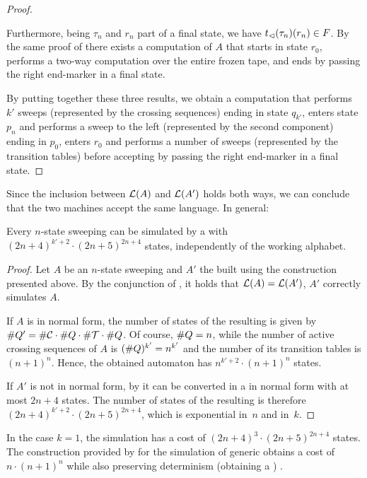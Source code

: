 \begin{proof}
\begin{enumerate}
		      Furthermore, being $\tau_n$ and $r_n$ part of a final state, we have $t_\lhd(\tau_n)(r_n)\in F$.
		      By the same proof of  there exists a computation of $A$ that starts in state $r_0$, performs a two-way computation over the entire frozen tape, and ends by passing the right end-marker in a final state.
	\end{enumerate}
	By putting together these three results, we obtain a computation that performs $k'$ sweeps (represented by the crossing sequences) ending in state $q_{k'}$, enters state $p_n$ and performs a sweep to the left (represented by the second component) ending in $p_0$, enters $r_0$ and performs a number of sweeps (represented by the transition tables) before accepting by passing the right end-marker in a final state.
\end{proof}

Since the inclusion between $\mathcal L(A)$ and $\mathcal L(A')$ holds both ways, we can conclude that the two machines accept the same language.
In general:
\begin{thrm}\label{thm:swkLAtoNFA}
	Every $n$-state sweeping \kDLA can be simulated by a \ONFA with $(2n+4)^{k'+2}\cdot(2n+5)^{2n+4}$ states, independently of the working alphabet.
\end{thrm}
\begin{proof}
	Let $A$ be an $n$-state sweeping \kDLA and $A'$ the \ONFA built using the construction presented above.
	By the conjunction of , it holds that $\mathcal L(A)=\mathcal L(A')$, \ie $A'$ correctly simulates $A$.

	If $A$ is in normal form, the number of states of the resulting \ONFA is given by $\# Q'=\# \mathcal C\cdot\# Q\cdot\# \mathcal T\cdot\# Q$.
	Of course, $\# Q=n$, while the number of active crossing sequences of $A$ is $(\# Q)^{k'}=n^{k'}$ and the number of its transition tables is $(n+1)^n$.
	Hence, the obtained automaton has $n^{k'+2}\cdot(n+1)^n$ states.

	If $A'$ is not in normal form, by  it can be converted in a \kDLA in normal form with at most $2n+4$ states.
	The number of states of the resulting \ONFA is therefore $(2n+4)^{k'+2}\cdot(2n+5)^{2n+4}$, which is exponential in~$n$ and in~$k$.
\end{proof}

In the case $k=1$, the simulation has a cost of $(2n+4)^3\cdot(2n+5)^{2n+4}$ states.
The construction provided by \citeauthor{PigPis14} \cite{PigPis14} for the simulation of generic \ODLA obtains a cost of $n\cdot (n+1)^n$ while also preserving determinism (\ie[,] obtaining a \ODFA) \cite{PigPis14}.



